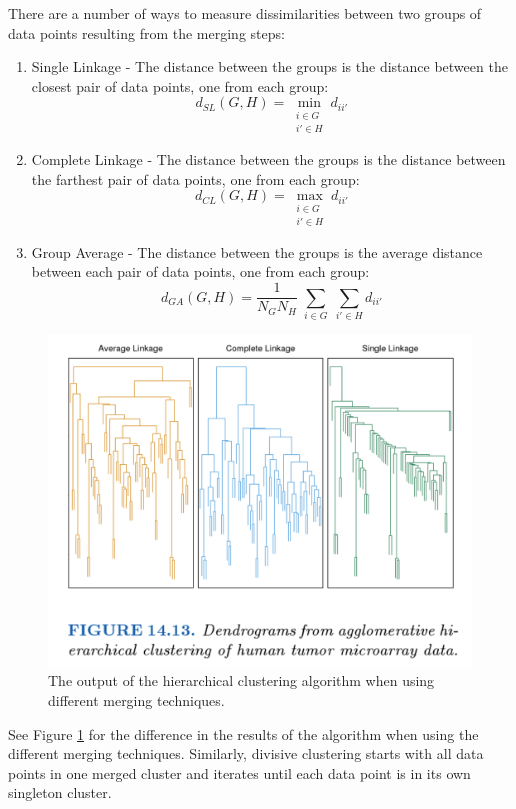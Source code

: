 \documentclass[a4paper]{article}
\begin{document}
There are a number of ways to measure dissimilarities between two groups of data points resulting from the merging steps:
\begin{enumerate}
\item Single Linkage - The distance between the groups is the distance between the closest pair of data points, one from each group: $$d_{SL}(G,H)=\min_{\substack{
   i \in G \\
   i' \in H
  }} d_{ii'}$$
\item Complete Linkage - The distance between the groups is the distance between the farthest pair of data points, one from each group: $$d_{CL}(G,H)=\max_{\substack{
   i \in G \\
   i' \in H
  }} d_{ii'}$$
\item Group Average - The distance between the groups is the average distance between each pair of data points, one from each group: $$d_{GA}(G,H)=\frac{1}{N_G N_H}\;\sum_{i \in G}\;\sum_{i' \in H} d_{ii'}$$
\end{enumerate}

\begin{figure}
\centering
\includegraphics[width=1.0\textwidth]{HierarchicalPhases.png}
\caption{\label{fig:MergingTechniques} The output of the hierarchical clustering algorithm when using different merging techniques.}
\end{figure}

See Figure \ref{fig:MergingTechniques} for the difference in the results of the algorithm when using the different merging techniques. Similarly, divisive clustering starts with all data points in one merged cluster and iterates until each data point is in its own singleton cluster. 
\end{document}
